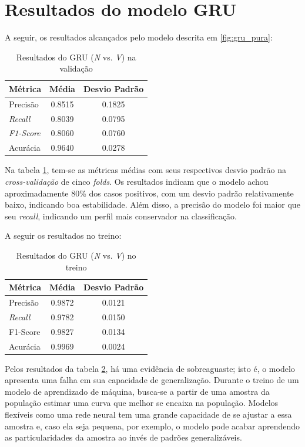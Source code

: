 \documentclass[
    12pt,                %
    openright,           %
    oneside,             %
    a4paper,             %
    brazil               %
]{abntex2}
\begin{document}
\section{Resultados do modelo GRU}
\label{sec:resultados_gru}

A seguir, os resultados alcançados pelo modelo descrita em \ref{fig:gru_pura}:

\begin{table}[H]
\centering
\caption{Resultados do GRU (\textit{N} vs. \textit{V}) na validação}
\label{tab:resultado_cv_gru_validacao}
\begin{tabular}{lcc}
\hline
\textbf{Métrica} & \textbf{Média} & \textbf{Desvio Padrão} \\
\hline
Precisão & 0.8515 & 0.1825 \\
\textit{Recall} & 0.8039  & 0.0795 \\
\textit{F1-Score} & 0.8060 & 0.0760 \\
Acurácia & 0.9640 & 0.0278 \\
\hline
\end{tabular}
\end{table}

Na tabela \ref{tab:resultado_cv_gru_validacao}, tem-se as métricas médias com seus respectivos desvio padrão na \textit{cross-validação} de cinco \textit{folds}.
Os resultados indicam que o modelo achou aproximadamente 80\% dos casos positivos, com um desvio padrão relativamente baixo, indicando boa estabilidade.
Além disso, a precisão do modelo foi maior que seu \textit{recall}, indicando um perfil mais conservador na classificação. 

A seguir os resultados no treino:

\begin{table}[H]
\centering
\caption{Resultados do GRU (\textit{N} vs. \textit{V}) no treino}
\label{tab:resultado_cv_gru_treino}
\begin{tabular}{lcc}
\hline
\textbf{Métrica} & \textbf{Média} & \textbf{Desvio Padrão} \\
\hline
Precisão & 0.9872 & 0.0121 \\
\textit{Recall} & 0.9782 & 0.0150 \\
F1-Score & 0.9827 & 0.0134 \\
Acurácia & 0.9969 & 0.0024 \\
\hline
\end{tabular}
\end{table}

Pelos resultados da tabela \ref{tab:resultado_cv_gru_treino}, há uma evidência de sobreaguaste; isto é, o modelo apresenta uma falha em sua capacidade
de generalização. Durante o treino de um modelo de aprendizado de máquina, busca-se a partir de uma amostra da população estimar uma curva que melhor
se encaixa na população. Modelos flexíveis como uma rede neural tem uma grande capacidade de se ajustar a essa amostra e, caso ela seja pequena, por exemplo,
o modelo pode acabar aprendendo as particularidades da amostra ao invés de padrões generalizáveis. 
\end{document}
